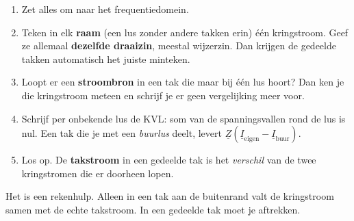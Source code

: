 \documentclass[a4paper,11pt]{article}
\begin{document}
\begin{theorie}[Werkwijze]
    \begin{enumerate}
        \item Zet alles om naar het frequentiedomein.
        \item Teken in elk \textbf{raam} (een lus zonder andere takken erin) \'e\'en kringstroom.
              Geef ze allemaal \textbf{dezelfde draaizin}, meestal wijzerzin. Dan krijgen de
              gedeelde takken automatisch het juiste minteken.
        \item Loopt er een \textbf{stroombron} in een tak die maar bij \'e\'en lus hoort? Dan ken je
              die kringstroom meteen en schrijf je er geen vergelijking meer voor.
        \item Schrijf per onbekende lus de KVL: som van de spanningsvallen rond de lus is nul.
              Een tak die je met een \emph{buurlus} deelt, levert
              $\underline{Z}(\underline{I}_{\text{eigen}} - \underline{I}_{\text{buur}})$.
        \item Los op. De \textbf{takstroom} in een gedeelde tak is het \emph{verschil} van de twee
              kringstromen die er doorheen lopen.
    \end{enumerate}
\end{theorie}

 Het is een rekenhulp. Alleen in een tak aan de
buitenrand valt de kringstroom samen met de echte takstroom. In een gedeelde tak moet je aftrekken.
\end{document}
